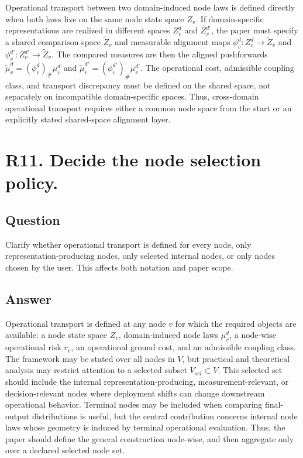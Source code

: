 \documentclass[11pt,a4paper]{article}
\begin{document}
Operational transport between two domain-induced node laws is defined directly when both laws live on the same node state space \(Z_v\). If domain-specific representations are realized in different spaces \(Z_v^d\) and \(Z_v^{d'}\), the paper must specify a shared comparison space \(\widetilde{Z}_v\) and measurable alignment maps \(\phi_v^d: Z_v^d \to \widetilde{Z}_v\) and \(\phi_v^{d'}: Z_v^{d'} \to \widetilde{Z}_v\). The compared measures are then the aligned pushforwards \(\widetilde{\mu}_v^d = (\phi_v^d)_\# \mu_v^d\) and \(\widetilde{\mu}_v^{d'} = (\phi_v^{d'})_\# \mu_v^{d'}\). The operational cost, admissible coupling class, and transport discrepancy must be defined on the shared space, not separately on incompatible domain-specific spaces. Thus, cross-domain operational transport requires either a common node space from the start or an explicitly stated shared-space alignment layer.

\section*{R11. Decide the node selection policy.}

\subsection*{Question}

Clarify whether operational transport is defined for every node, only representation-producing nodes, only selected internal nodes, or only nodes chosen by the user. This affects both notation and paper scope.

\subsection*{Answer}

Operational transport is defined at any node \(v\) for which the required objects are available: a node state space \(Z_v\), domain-induced node laws \(\mu_v^d\), a node-wise operational risk \(r_v\), an operational ground cost, and an admissible coupling class. The framework may be stated over all nodes in \(V\), but practical and theoretical analysis may restrict attention to a selected subset \(V_{sel} \subset V\). This selected set should include the internal representation-producing, measurement-relevant, or decision-relevant nodes where deployment shifts can change downstream operational behavior. Terminal nodes may be included when comparing final-output distributions is useful, but the central contribution concerns internal node laws whose geometry is induced by terminal operational evaluation. Thus, the paper should define the general construction node-wise, and then aggregate only over a declared selected node set.
\end{document}
